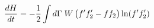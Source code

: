 \documentclass[preview]{standalone}
\begin{document}
\begin{align*}
\special{dvisvgm:raw <g id='unique000'>}\dv{H}{t}=-\frac12\int d\Gamma\;W\,\big(f'f_2'-ff_2\big)\ln(f'f_2')\special{dvisvgm:raw </g>}
\end{align*}
\end{document}

